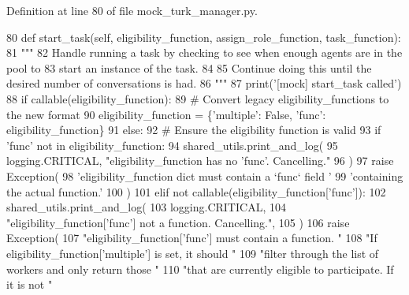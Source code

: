 Definition at line 80 of file mock\+\_\+turk\+\_\+manager.\+py.


\begin{DoxyCode}
80     \textcolor{keyword}{def }start\_task(self, eligibility\_function, assign\_role\_function, task\_function):
81         \textcolor{stringliteral}{"""}
82 \textcolor{stringliteral}{        Handle running a task by checking to see when enough agents are in the pool to}
83 \textcolor{stringliteral}{        start an instance of the task.}
84 \textcolor{stringliteral}{}
85 \textcolor{stringliteral}{        Continue doing this until the desired number of conversations is had.}
86 \textcolor{stringliteral}{        """}
87         print(\textcolor{stringliteral}{'[mock] start\_task called'})
88         \textcolor{keywordflow}{if} callable(eligibility\_function):
89             \textcolor{comment}{# Convert legacy eligibility\_functions to the new format}
90             eligibility\_function = \{\textcolor{stringliteral}{'multiple'}: \textcolor{keyword}{False}, \textcolor{stringliteral}{'func'}: eligibility\_function\}
91         \textcolor{keywordflow}{else}:
92             \textcolor{comment}{# Ensure the eligibility function is valid}
93             \textcolor{keywordflow}{if} \textcolor{stringliteral}{'func'} \textcolor{keywordflow}{not} \textcolor{keywordflow}{in} eligibility\_function:
94                 shared\_utils.print\_and\_log(
95                     logging.CRITICAL, \textcolor{stringliteral}{"eligibility\_function has no 'func'. Cancelling."}
96                 )
97                 \textcolor{keywordflow}{raise} Exception(
98                     \textcolor{stringliteral}{'eligibility\_function dict must contain a `func` field '}
99                     \textcolor{stringliteral}{'containing the actual function.'}
100                 )
101             \textcolor{keywordflow}{elif} \textcolor{keywordflow}{not} callable(eligibility\_function[\textcolor{stringliteral}{'func'}]):
102                 shared\_utils.print\_and\_log(
103                     logging.CRITICAL,
104                     \textcolor{stringliteral}{"eligibility\_function['func'] not a function. Cancelling."},
105                 )
106                 \textcolor{keywordflow}{raise} Exception(
107                     \textcolor{stringliteral}{"eligibility\_function['func'] must contain a function. "}
108                     \textcolor{stringliteral}{"If eligibility\_function['multiple'] is set, it should "}
109                     \textcolor{stringliteral}{"filter through the list of workers and only return those "}
110                     \textcolor{stringliteral}{"that are currently eligible to participate. If it is not "}

\end{DoxyCode}
